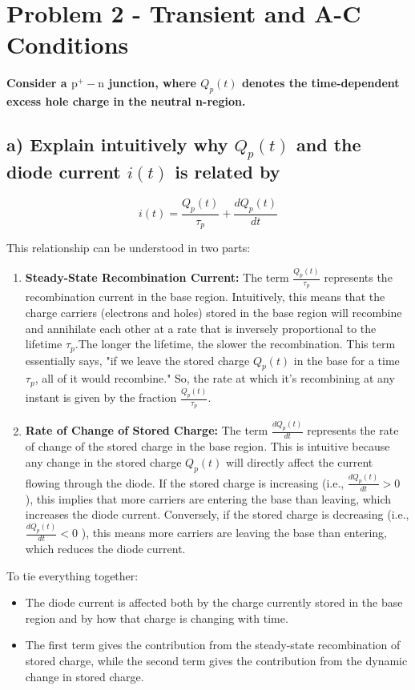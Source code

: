 \section{Problem 2 - Transient and A-C Conditions}
\textbf{Consider a $\mathrm{p}^{+}-\mathrm{n}$ junction, where $Q_p(t)$ denotes the time-dependent excess hole charge in the neutral n-region. }
\subsection*{a) Explain intuitively why $Q_p(t)$ and the diode current $i(t)$ is related by }
$$ i(t)=\frac{Q_p(t)}{\tau_p}+\frac{d Q_p(t)}{d t} $$ 

This relationship can be understood in two parts:

\begin{enumerate}
    \item \textbf{Steady-State Recombination Current:}
    \subitem The term $\frac{Q_p(t)}{\tau_p}$  represents the recombination current in the base region. Intuitively, this means that the charge carriers (electrons and holes) stored in the base region will recombine and annihilate each other at a rate that is inversely proportional to the lifetime $\tau_p$.The longer the lifetime, the slower the recombination. This term essentially says, "if we leave the stored charge $Q_p(t)$  in the base for a time $\tau_p$, all of it would recombine." So, the rate at which it's recombining at any instant is given by the fraction $\frac{Q_p(t)}{\tau_p}$.
    \item \textbf{Rate of Change of Stored Charge:}
    \subitem The term $\frac{d Q_p(t)}{d t}$ represents the rate of change of the stored charge in the base region. This is intuitive because any change in the stored charge $Q_p(t)$ will directly affect the current flowing through the diode. If the stored charge is increasing (i.e., $\frac{d Q_p(t)}{d t}>0$ ), this implies that more carriers are entering the base than leaving, which increases the diode current. Conversely, if the stored charge is decreasing (i.e., $\frac{d Q_p(t)}{d t}<0$ ), this means more carriers are leaving the base than entering, which reduces the diode current.
\end{enumerate}

To tie everything together:
\begin{itemize}
    \item The diode current is affected both by the charge currently stored in the base region and by how that charge is changing with time.
    \item The first term gives the contribution from the steady-state recombination of stored charge, while the second term gives the contribution from the dynamic change in stored charge.
\end{itemize}


